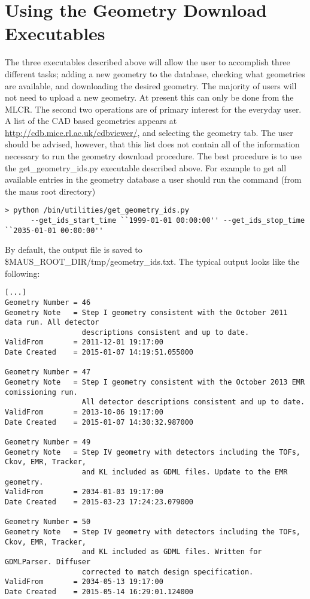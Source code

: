 \section{Using the Geometry Download Executables}

The three executables described above will allow the user to
accomplish three different tasks; adding a new geometry to the
database, checking what geometries are available, and downloading the
desired geometry. The majority of users will not need to upload a new
geometry. At present this can only be done from the MLCR. The second
two operations are of primary interest for the everyday user. A list
of the CAD based geometries appears at
\url{http://cdb.mice.rl.ac.uk/cdbviewer/}, and selecting the geometry
tab. The user should be advised, however, that this list does not
contain all of the information necessary to run the geometry download
procedure. The best procedure is to use the get\_geometry\_ids.py
executable described above. For example to get all available entries
in the geometry database a user should run the command (from the maus
root directory)
\begin{verbatim}
> python /bin/utilities/get_geometry_ids.py 
      --get_ids_start_time ``1999-01-01 00:00:00'' --get_ids_stop_time ``2035-01-01 00:00:00''
\end{verbatim}
By default, the output file is saved to
\$MAUS\_ROOT\_DIR/tmp/geometry\_ids.txt. The typical output looks like
the following:
\begin{verbatim}
[...]
Geometry Number = 46
Geometry Note   = Step I geometry consistent with the October 2011 data run. All detector
                  descriptions consistent and up to date.
ValidFrom       = 2011-12-01 19:17:00
Date Created    = 2015-01-07 14:19:51.055000

Geometry Number = 47
Geometry Note   = Step I geometry consistent with the October 2013 EMR comissioning run.
                  All detector descriptions consistent and up to date.
ValidFrom       = 2013-10-06 19:17:00
Date Created    = 2015-01-07 14:30:32.987000

Geometry Number = 49
Geometry Note   = Step IV geometry with detectors including the TOFs, Ckov, EMR, Tracker,
                  and KL included as GDML files. Update to the EMR geometry.
ValidFrom       = 2034-01-03 19:17:00
Date Created    = 2015-03-23 17:24:23.079000

Geometry Number = 50
Geometry Note   = Step IV geometry with detectors including the TOFs, Ckov, EMR, Tracker,
                  and KL included as GDML files. Written for GDMLParser. Diffuser
                  corrected to match design specification.
ValidFrom       = 2034-05-13 19:17:00
Date Created    = 2015-05-14 16:29:01.124000
\end{verbatim}

